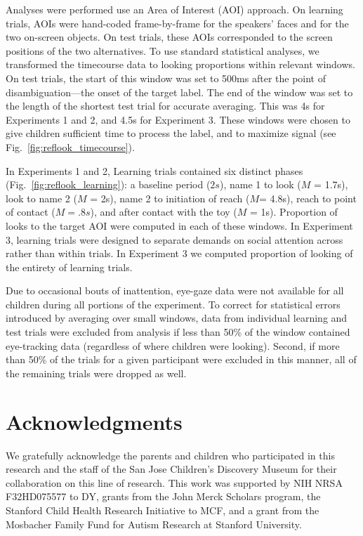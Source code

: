 \documentclass[man,floatsintext]{apa6}
\begin{document}
\setlength{\parskip}{0em}

Analyses were performed use an Area of Interest (AOI) approach. On learning trials, AOIs were hand-coded frame-by-frame for the speakers' faces and for the two on-screen objects. On test trials, these AOIs corresponded to the screen positions of the two alternatives. To use standard statistical analyses, we transformed the timecourse data to looking proportions within relevant windows. On test trials, the start of this window was set to 500ms after the point of disambiguation---the onset of the target label. The end of the window was set to the length of the shortest test trial for accurate averaging. This was 4s for Experiments 1 and 2, and 4.5s for Experiment 3. These windows were chosen to give children sufficient time to process the label, and to maximize signal (see Fig.~\ref{fig:reflook_timecourse}).

In Experiments 1 and 2, Learning trials contained six distinct phases (Fig.~\ref{fig:reflook_learning}): a baseline period ($2s$), name 1 to look ({\small$M$ = 1.7s}), look to name 2 ({\small$M$ = 2s}), name 2 to initiation of reach ({\small$M$= 4.8s}), 	reach to point of contact ({\small$M = .8s$}), and after contact with the toy ({\small$M$ = 1s}). Proportion of looks to the target AOI were computed in each of these windows. In Experiment 3, learning trials were designed to separate demands on social attention across rather than within trials. In Experiment 3 we computed proportion of looking of the entirety of learning trials.

Due to occasional bouts of inattention, eye-gaze data were not available for all children during all portions of the experiment. To correct for statistical errors introduced by averaging over small windows, data from individual learning and test trials were excluded from analysis if less than 50\% of the window contained eye-tracking data (regardless of where children were looking). Second, if more than 50\% of the trials for a given participant were excluded in this manner, all of the remaining trials were dropped as well.

\section{Acknowledgments}

We gratefully acknowledge the parents and children who participated in this research and the staff of the San Jose Children's Discovery Museum for their collaboration on this line of research. This work was supported by NIH NRSA F32HD075577 to DY, grants from the John Merck Scholars program, the Stanford Child Health Research Initiative to MCF, and a grant from the Mosbacher Family Fund for Autism Research at Stanford University.
\end{document}
